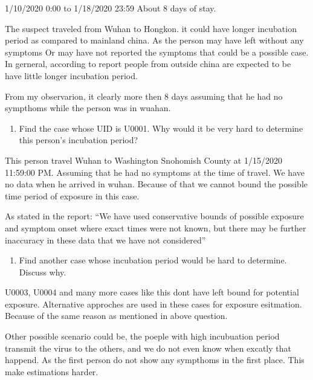 \documentclass[
]{article}
\providecommand{\tightlist}{%
  \setlength{\itemsep}{0pt}\setlength{\parskip}{0pt}}
\begin{document}
1/10/2020 0:00 to 1/18/2020 23:59 About 8 days of stay.

The suspect traveled from Wuhan to Hongkon. it could have longer
incubation period as compared to mainland china. As the person may have
left without any symptoms Or may have not reported the symptoms that
could be a possible case. In gerneral, according to report people from
outside china are expected to be have little longer incubation period.

From my observarion, it clearly more then 8 days assuming that he had no
sympthoms while the person was in wuahan.

\begin{enumerate}
\def\labelenumi{(\arabic{enumi})}
\setcounter{enumi}{2}
\tightlist
\item
  Find the case whose UID is U0001. Why would it be very hard to
  determine this person's incubation period?
\end{enumerate}

This person travel Wuhan to Washington Snohomish County at 1/15/2020
11:59:00 PM. Assuming that he had no symptoms at the time of travel. We
have no data when he arrived in wuhan. Because of that we cannot bound
the possible time period of exposure in this case.

As stated in the report: ``We have used conservative bounds of possible
exposure and symptom onset where exact times were not known, but there
may be further inaccuracy in these data that we have not considered''

\begin{enumerate}
\def\labelenumi{(\arabic{enumi})}
\setcounter{enumi}{3}
\tightlist
\item
  Find another case whose incubation period would be hard to determine.
  Discuss why.
\end{enumerate}

U0003, U0004 and many more cases like this dont have left bound for
potential exposure. Alternative approches are used in these cases for
exposure esitmation. Because of the same reason as mentioned in above
question.

Other possible scenario could be, the poeple with high incubuation
period transmit the virus to the others, and we do not even know when
excatly that happend. As the first person do not show any sympthoms in
the first place. This make estimations harder.
\end{document}
